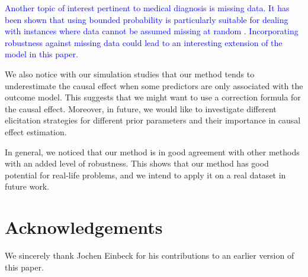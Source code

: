 \documentclass[preprint,12pt]{elsarticle}
\newcommand{\added}[1]{\textcolor{blue}{#1}}
\begin{document}
\added{%
Another topic of interest pertinent to medical diagnosis is missing data.
It has been shown that using bounded probability is particularly suitable
for dealing with instances where data cannot be assumed missing at random
\citep{decoomanzaffalon2004}.
Incorporating robustness against missing data could lead to an interesting
extension of the model in this paper.%
}

We also notice with our simulation studies that our
method tends to underestimate the causal effect
when some predictors are only associated with the
outcome model. This suggests that we might want
to use a correction formula for the causal effect.
Moreover, in future, we would
like to investigate different elicitation strategies for different prior parameters and their importance in causal effect estimation. 


In general, we noticed that our method
is in good agreement with other methods with an added level of robustness.
This shows that our method has good potential for real-life problems,
and we intend to apply it on a real dataset in future work.

\section*{Acknowledgements}

We sincerely thank Jochen Einbeck for his contributions to an earlier version of this paper.

 

\end{document}
